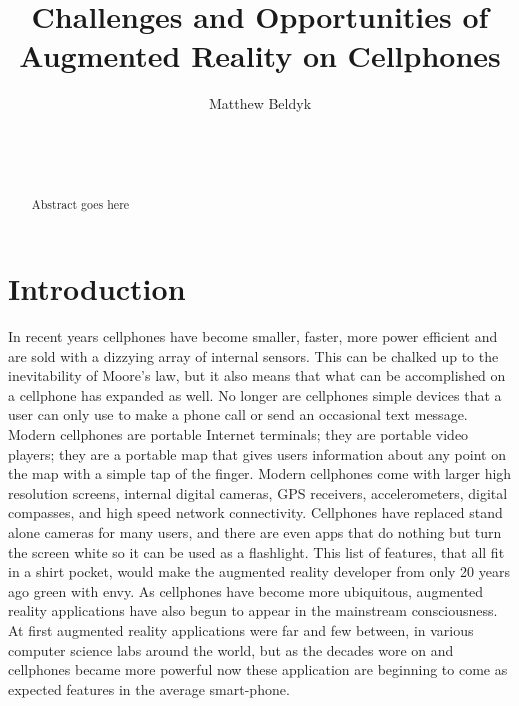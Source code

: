 \documentclass{acm_proc_article-sp}
\begin{document}
\title{Challenges and Opportunities of Augmented Reality on Cellphones}

%
\author{
\alignauthor
Matthew Beldyk\\
\\
\\
\\
}
\maketitle
\begin{abstract}
Abstract goes here
\end{abstract}

\section{Introduction}
In recent years cellphones have become smaller, faster, more power efficient and are sold with a dizzying array of internal sensors.  This can be chalked up to the inevitability of Moore's law, but it also means that what can be accomplished on a cellphone has expanded as well.  No longer are cellphones simple devices that a user can only use to  make a phone call or send an occasional text message. Modern cellphones are portable Internet terminals; they are portable video players; they are a portable map that gives users information about any point on the map with a simple tap of the finger.  Modern cellphones come with larger high resolution screens, internal digital cameras, GPS receivers, accelerometers, digital compasses, and high speed network connectivity. Cellphones have replaced stand alone cameras for many users, and there are even apps that do nothing but turn the screen white so it can be used as a flashlight. This list of features, that all fit in a shirt pocket, would make the augmented reality developer from only 20 years ago green with envy.  As cellphones have become more ubiquitous, augmented reality applications have also begun to appear in the mainstream consciousness.  At first augmented reality applications were far and few between, in various computer science labs around the world, but as the decades wore on and cellphones became more powerful now these application are beginning to come as expected features in the average smart-phone.  
\end{document}
